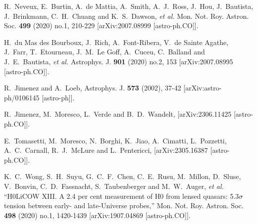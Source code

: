 \documentclass[aps,prl,10pt,twocolumn,superscriptaddress, nofootinbib]{revtex4}
\begin{document}
\begin{thebibliography}{99}
R.~Neveux, E.~Burtin, A.~de Mattia, A.~Smith, A.~J.~Ross, J.~Hou, J.~Bautista, J.~Brinkmann, C.~H.~Chuang and K.~S.~Dawson, \textit{et al.}
Mon. Not. Roy. Astron. Soc. \textbf{499} (2020) no.1, 210-229
[arXiv:2007.08999 [astro-ph.CO]].

H.~du Mas des Bourboux, J.~Rich, A.~Font-Ribera, V.~de Sainte Agathe, J.~Farr, T.~Etourneau, J.~M.~Le Goff, A.~Cuceu, C.~Balland and J.~E.~Bautista, \textit{et al.}
Astrophys. J. \textbf{901} (2020) no.2, 153
[arXiv:2007.08995 [astro-ph.CO]].

R.~Jimenez and A.~Loeb,
Astrophys. J. \textbf{573} (2002), 37-42
[arXiv:astro-ph/0106145 [astro-ph]].

R.~Jimenez, M.~Moresco, L.~Verde and B.~D.~Wandelt,
[arXiv:2306.11425 [astro-ph.CO]].

E.~Tomasetti, M.~Moresco, N.~Borghi, K.~Jiao, A.~Cimatti, L.~Pozzetti, A.~C.~Carnall, R.~J.~McLure and L.~Pentericci,
[arXiv:2305.16387 [astro-ph.CO]].

K.~C.~Wong, S.~H.~Suyu, G.~C.~F.~Chen, C.~E.~Rusu, M.~Millon, D.~Sluse, V.~Bonvin, C.~D.~Fassnacht, S.~Taubenberger and M.~W.~Auger, \textit{et al.}
``H0LiCOW \textendash{} XIII. A 2.4 per cent measurement of H0 from lensed quasars: 5.3\ensuremath{\sigma} tension between early- and late-Universe probes,''
Mon. Not. Roy. Astron. Soc. \textbf{498} (2020) no.1, 1420-1439
[arXiv:1907.04869 [astro-ph.CO]].


\end{thebibliography}
\end{document}
